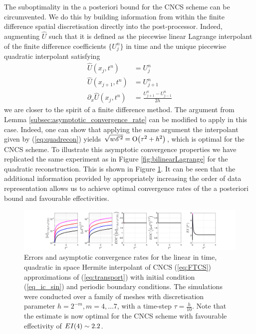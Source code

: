 \documentclass[final]{amsart}
\numberwithin{equation}{section}
\begin{document}
The suboptimality in the a posteriori bound for the CNCS scheme can be
circumvented. We do this by building information from within the
finite difference spatial discretisation directly into the
post-processor. Indeed, augmenting $\widehat U$ such that it is
defined as the piecewise linear Lagrange interpolant of the finite
difference coefficients $\{U^n_j\}$ in time and the unique piecewise
quadratic interpolant satisfying
\begin{equation}
  \label{eq:quadrecon}
\begin{split}
\widehat U(x_j,t^n) &= U^n_j
\\
\widehat U(x_{j+1},t^n) &= U^n_{j+1}
\\
\partial_x \widehat U(x_j, t^n) &= \frac{U^n_{j+1}-U^n_{j-1}}{2h}
\end{split}
\end{equation}
we are closer to the spirit of a finite difference method. The
argument from Lemma \ref{subsec:asymptotic_convergence_rate} can be
modified to apply in this case. Indeed, one can show that applying the
same argument the interpolant given by (\ref{eq:quadrecon}) yields
$\sqrt{w\mathscr E^2} = \operatorname{O}\!\left({\tau^2+h^2}\right)$, which is optimal for the CNCS
scheme. To illustrate this asymptotic convergence properties we have
replicated the same experiment as in Figure \ref{fig:bilinearLagrange}
for the quadratic reconstruction. This is shown in Figure
\ref{fig:FTCS_prelim_P2}.  It can be seen that the additional
information provided by appropriately increasing the order of data
representation allows us to achieve optimal convergence rates of the a
posteriori bound and favourable effectivities.

\begin{figure}[H] 
	\includegraphics[width=\textwidth]{../figures/fig_CNCS_plots_1x5_sin_IC_ind_uniform_P2}	
	\caption{
		\label{fig:FTCS_prelim_P2}
		Errors and asymptotic convergence rates for the linear in time,
		quadratic in space Hermite interpolant of CNCS (\ref{eq:FTCS})
		approximations of (\ref{eq:transport}) with initial condition
		(\ref{eq_ic_sin}) and periodic boundary conditions. The simulations were conducted over a family of
		meshes with discretisation parameter $h = 2^{-m}, m = 4,\dots 7$,
		with a time-step $\tau = \tfrac{h}{10}$. Note that the estimate
		is now optimal for the CNCS scheme with favourable effectivity of
		$EI \!\left({4}\right) \sim 2.2$.}
\end{figure}
\end{document}
